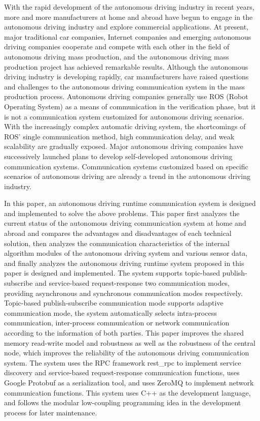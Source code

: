 \begin{abstract*}
  With the rapid development of the autonomous driving industry in recent years, 
  more and more manufacturers at home and abroad have begun to engage in the autonomous driving industry and explore commercial applications. 
  At present, major traditional car companies, 
  Internet companies and emerging autonomous driving companies cooperate and compete with each other in the field of autonomous driving mass production, 
  and the autonomous driving mass production project has achieved remarkable results. 
  Although the autonomous driving industry is developing rapidly, 
  car manufacturers have raised questions and challenges to the autonomous driving communication system in the mass production process. 
  Autonomous driving companies generally use ROS (Robot Operating System) as a means of communication in the verification phase, 
  but it is not a communication system customized for autonomous driving scenarios. 
  With the increasingly complex automatic driving system, 
  the shortcomings of ROS' single communication method, 
  high communication delay, and weak scalability are gradually exposed. 
  Major autonomous driving companies have successively launched plans to develop self-developed autonomous driving communication systems. 
  Communication systems customized based on specific scenarios of autonomous driving are already a trend in the autonomous driving industry.

  In this paper, an autonomous driving runtime communication system is designed and implemented to solve the above problems. 
  This paper first analyzes the current status of the autonomous driving communication system at home and abroad and compares the advantages and disadvantages of each technical solution, 
  then analyzes the communication characteristics of the internal algorithm modules of the autonomous driving system and various sensor data, 
  and finally analyzes the autonomous driving runtime system proposed in this paper is designed and implemented. 
  The system supports topic-based publish-subscribe and service-based request-response two communication modes, 
  providing asynchronous and synchronous communication modes respectively.
  Topic-based publish-subscribe communication mode supports adaptive communication mode, 
  the system automatically selects intra-process communication, 
  inter-process communication or network communication according to the information of both parties. 
  This paper improves the shared memory read-write model and robustness as well as the robustness of the central node, 
  which improves the reliability of the autonomous driving communication system. 
  The system uses the RPC framework rest\_rpc to implement service discovery and service-based request-response communication functions, 
  uses Google Protobuf as a serialization tool, and uses ZeroMQ to implement network communication functions. 
  This system uses C++ as the development language, 
  and follows the modular low-coupling programming idea in the development process for later maintenance.


\end{abstract*}
